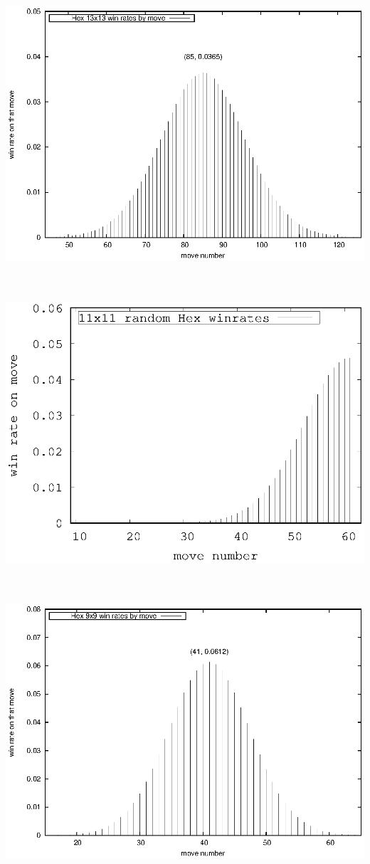 \documentclass[12pt]{article}
\begin{document}
\ \hfill \includegraphics{code/data/gn/winrate.13.eps} \hfill \ 

\ \hfill \includegraphics{code/data/gn/winrate11.eps} \hfill \ 

\ \hfill \includegraphics{code/data/gn/winrate.9.eps} \hfill \ 
\end{document}
